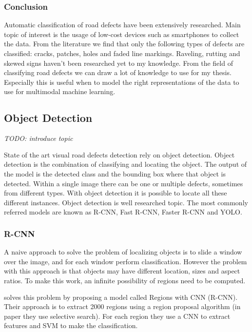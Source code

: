 \subsubsection{Conclusion}
Automatic classification of road defects have been extensively researched. Main topic of interest is the usage of low-cost devices such as smartphones to collect the data. From the literature we find that only the following types of defects are classified: cracks, patches, holes and faded line markings. Raveling, rutting and skewed signs haven't been researched yet to my knowledge. From the field of classifying road defects we can draw a lot of knowledge to use for my thesis. Especially this is useful when to model the right representations of the data to use for multimodal machine learning.



\subsection{Object Detection}

\textit{TODO: introduce topic}

State of the art visual road defects detection rely on object detection. Object detection is the combination of classifying and locating the object. The output of the model is the detected class and the bounding box where that object is detected. Within a single image there can be one or multiple defects, sometimes from different types. With object detection it is possible to locate all these different instances. Object detection is well researched topic. The most commonly referred models are known as R-CNN, Fast R-CNN, Faster R-CNN and YOLO.


\subsubsection{R-CNN}
A naive approach to solve the problem of localizing objects is to slide a window over the image, and for each window perform classification. However the problem with this approach is that objects may have different location, sizes and aspect ratios. To make this work, an infinite possibility of regions need to be computed. 

 solves this problem by proposing a model called Regions with CNN (R-CNN). Their approach is to extract 2000 regions using a region proposal algorithm (in paper they use selective search). For each region they use a CNN to extract features and SVM to make the classification. 

